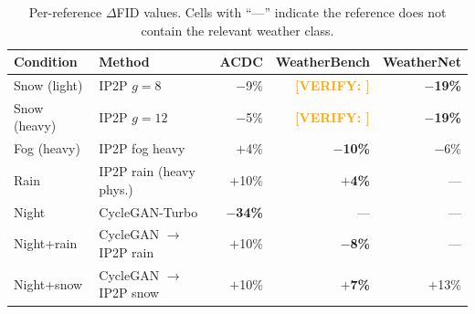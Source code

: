 \documentclass[12pt]{article}
\newcommand{\verify}[1]{\textcolor{orange}{\textbf{[VERIFY: #1]}}}
\begin{document}
\begin{table}[H]
\centering
\caption{Per-reference $\Delta$FID values. Cells with ``---'' indicate the reference does not contain the relevant weather class.}
\label{tab:supp-fid-per-ref}
\small
\begin{tabular}{llrrr}
\toprule
\textbf{Condition} & \textbf{Method} & \textbf{ACDC} & \textbf{WeatherBench} & \textbf{WeatherNet} \\
\midrule
Snow (light) & IP2P $g{=}8$               & $-$9\%   & \verify{} & \textbf{$-$19\%} \\
Snow (heavy) & IP2P $g{=}12$              & $-$5\%   & \verify{} & \textbf{$-$19\%} \\
Fog (heavy)  & IP2P fog heavy             & $+$4\%   & \textbf{$-$10\%} & $-$6\% \\
Rain         & IP2P rain (heavy phys.)    & $+$10\%  & \textbf{$+$4\%}  & --- \\
Night        & CycleGAN-Turbo             & \textbf{$-$34\%} & --- & --- \\
Night+rain   & CycleGAN $\to$ IP2P rain   & $+$10\%  & \textbf{$-$8\%}  & --- \\
Night+snow   & CycleGAN $\to$ IP2P snow   & $+$10\%  & \textbf{$+$7\%}  & $+$13\% \\
\bottomrule
\end{tabular}
\end{table}



\end{document}
